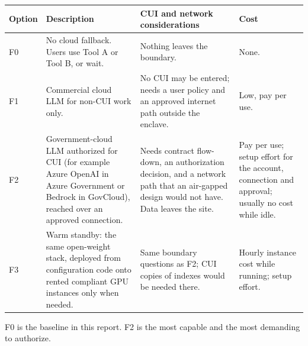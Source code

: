 {\footnotesize
\begin{xltabular}{\textwidth}{@{}l Y{1.0} Y{1.1} Y{0.9}@{}}
  \toprule
  Option & Description & CUI and network considerations & Cost \\
  \midrule
  \endhead
  F0 & No cloud fallback. Users use Tool A or Tool B, or wait. & Nothing leaves the boundary. & None. \\
  F1 & Commercial cloud LLM for non-CUI work only. & No CUI may be entered; needs a user policy and an approved internet path outside the enclave. & Low, pay per use. \\
  F2 & Government-cloud LLM authorized for CUI (for example Azure OpenAI in Azure Government or Bedrock in GovCloud), reached over an approved connection. & Needs contract flow-down, an authorization decision, and a network path that an air-gapped design would not have. Data leaves the site. & Pay per use; setup effort for the account, connection and approval; usually no cost while idle. \\
  F3 & Warm standby: the same open-weight stack, deployed from configuration code onto rented compliant GPU instances only when needed. & Same boundary questions as F2; CUI copies of indexes would be needed there. & Hourly instance cost while running; setup effort. \\
  \bottomrule
\end{xltabular}}
F0 is the baseline in this report. F2 is the most capable and the most demanding to
authorize. 

